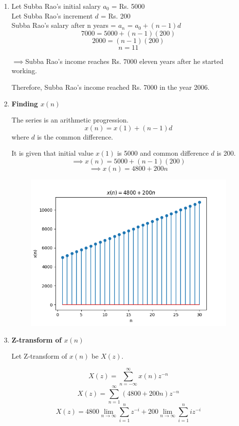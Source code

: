 \documentclass[journal,12pt,twocolumn]{IEEEtran}
\theoremstyle{remark}
\begin{document}
\begin{enumerate}
\item
Let Subba Rao's initial salary $a_0$ = Rs. 5000
\\
Let Subba Rao's increment $d$ = Rs. 200
\\
Subba Rao's salary after n years = $a_n$ = $a_0 + (n - 1)d$
\\
\[7000 = 5000 + (n - 1)(200)\]
\[2000 = (n - 1)(200)\]
\[n = 11\]

$\implies$Subba Rao's income reaches Rs. 7000 eleven years after he started working.

Therefore, Subba Rao's income reached Rs. 7000 in the year 2006.

\item \textbf{Finding $x(n)$}

The series is an arithmetic progression.
\[x(n) = x(1) + (n - 1)d\]
where $d$ is the common difference.

It is given that initial value $x(1)$ is 5000 and common difference $d$ is 200.
\[\implies x(n) = 5000 + (n - 1)(200)\]
\[\implies x(n) = 4800 + 200n\]

\begin{figure}[h!]
    \centering
    \includegraphics[width=\columnwidth]{plots/10_5_2_19.png}
\end{figure}

\item \textbf{Z-transform of $x(n)$}

Let Z-transform of $x(n)$ be $X(z)$.

\[X(z) = \sum_{n = -\infty}^{\infty} x(n)z^{-n}\]
\[X(z) = \sum_{n = 1}^{\infty} (4800 + 200n)z^{-n}\]
\[X(z) = 4800\lim_{n\to\infty}\sum_{i = 1}^{n}z^{-i} + 200\lim_{n\to\infty}\sum_{i = 1}^{n}iz^{-i}\]


\end{enumerate}
\end{document}
